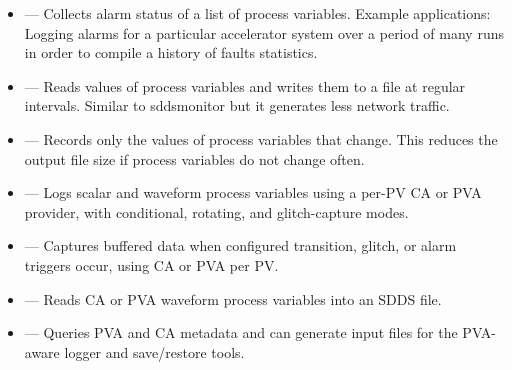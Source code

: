 \documentclass[11pt]{article}
\begin{document}
\begin{itemize}
        with optional statistical analysis. The list of readback process variables is
        constructed by multiplying a rootname list and a suffix list.  Example
        application: investigation of unforeseen physical dependences, measure
        corrector-bpm response matrices.
  \item {} --- Collects alarm status of a list of process variables.
        Example applications: Logging alarms for a particular accelerator system over a period of
        many runs in order to compile a history of faults statistics.
  \item {} --- Reads values of process variables and writes them to a file at regular intervals. Similar to sddsmonitor but it generates less network traffic.
  \item {} --- Records only the values of process variables that change. This reduces the output file size if process variables do not change often.
  \item {} --- Logs scalar and waveform process variables
        using a per-PV CA or PVA provider, with conditional, rotating, and
        glitch-capture modes.
  \item {} --- Captures buffered data when configured
        transition, glitch, or alarm triggers occur, using CA or PVA per PV.
  \item {} --- Reads CA or PVA waveform process variables into
        an SDDS file.
  \item {} --- Queries PVA and CA metadata and can generate
        input files for the PVA-aware logger and save/restore tools.
\end{itemize}
\end{document}
